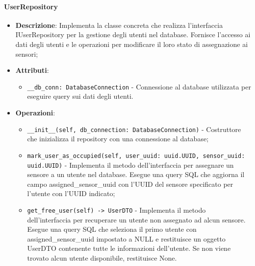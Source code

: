 \documentclass[10pt]{article}
\begin{document}
    \paragraph{UserRepository}
    \begin{itemize} 
    \item \textbf{Descrizione}: Implementa la classe concreta che realizza l'interfaccia IUserRepository per la gestione degli utenti nel database. Fornisce l'accesso ai dati degli utenti e le operazioni per modificare il loro stato di assegnazione ai sensori;
    \item \textbf{Attributi}:
    \begin{itemize}
        \item \texttt{\_\_db\_conn: DatabaseConnection} - Connessione al database utilizzata per eseguire query sui dati degli utenti.
    \end{itemize}
    
    \item \textbf{Operazioni}:
    \begin{itemize}
        \item \texttt{\_\_init\_\_(self, db\_connection: DatabaseConnection)} - Costruttore che inizializza il repository con una connessione al database;
        
        \item \texttt{mark\_user\_as\_occupied(self, user\_uuid: uuid.UUID, sensor\_uuid: uuid.UUID)} - Implementa il metodo dell'interfaccia per assegnare un sensore a un utente nel database. Esegue una query SQL che aggiorna il campo assigned\_sensor\_uuid con l'UUID del sensore specificato per l'utente con l'UUID indicato;
        
        \item \texttt{get\_free\_user(self) -> UserDTO} - Implementa il metodo dell'interfaccia per recuperare un utente non assegnato ad alcun sensore. Esegue una query SQL che seleziona il primo utente con assigned\_sensor\_uuid impostato a NULL e restituisce un oggetto UserDTO contenente tutte le informazioni dell'utente. Se non viene trovato alcun utente disponibile, restituisce None.
    \end{itemize}
    \end{itemize}
\end{document}
